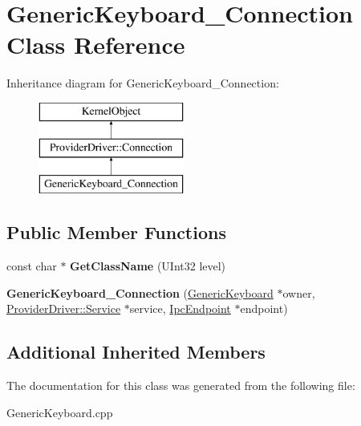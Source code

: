 \hypertarget{class_generic_keyboard___connection}{}\section{Generic\+Keyboard\+\_\+\+Connection Class Reference}
\label{class_generic_keyboard___connection}
Inheritance diagram for Generic\+Keyboard\+\_\+\+Connection\+:\begin{figure}[H]
\begin{center}
\leavevmode
\includegraphics[height=3.000000cm]{class_generic_keyboard___connection}
\end{center}
\end{figure}
\subsection*{Public Member Functions}
\begin{DoxyCompactItemize}
\item 
\mbox{\label{class_generic_keyboard___connection_a61982e1bf3f8943cec4eacf1fb136966}} 
const char $\ast$ {\bfseries Get\+Class\+Name} (U\+Int32 level)
\item 
\mbox{\label{class_generic_keyboard___connection_a4d81ad65ccc20afa0eb1ea4b6e5f67d6}} 
{\bfseries Generic\+Keyboard\+\_\+\+Connection} (\hyperlink{class_generic_keyboard}{Generic\+Keyboard} $\ast$owner, \hyperlink{class_provider_driver_1_1_service}{Provider\+Driver\+::\+Service} $\ast$service, \hyperlink{class_ipc_endpoint}{Ipc\+Endpoint} $\ast$endpoint)
\end{DoxyCompactItemize}
\subsection*{Additional Inherited Members}


The documentation for this class was generated from the following file\+:\begin{DoxyCompactItemize}
\item 
Generic\+Keyboard.\+cpp\end{DoxyCompactItemize}
